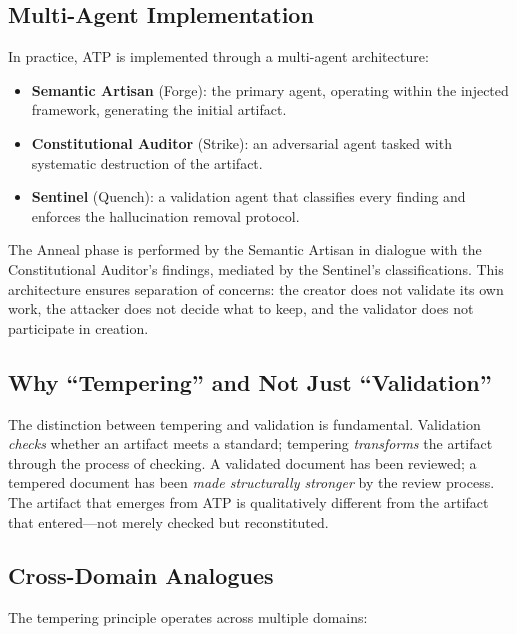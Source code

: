 \documentclass[12pt,a4paper]{article}
\begin{document}
\subsection{Multi-Agent Implementation}

In practice, ATP is implemented through a multi-agent architecture:

\begin{itemize}
  \item \textbf{Semantic Artisan} (Forge): the primary agent, operating within the injected framework, generating the initial artifact.
  \item \textbf{Constitutional Auditor} (Strike): an adversarial agent tasked with systematic destruction of the artifact.
  \item \textbf{Sentinel} (Quench): a validation agent that classifies every finding and enforces the hallucination removal protocol.
\end{itemize}

The Anneal phase is performed by the Semantic Artisan in dialogue with the Constitutional Auditor's findings, mediated by the Sentinel's classifications. This architecture ensures separation of concerns: the creator does not validate its own work, the attacker does not decide what to keep, and the validator does not participate in creation.

\subsection{Why ``Tempering'' and Not Just ``Validation''}

The distinction between tempering and validation is fundamental. Validation \emph{checks} whether an artifact meets a standard; tempering \emph{transforms} the artifact through the process of checking. A validated document has been reviewed; a tempered document has been \emph{made structurally stronger} by the review process. The artifact that emerges from ATP is qualitatively different from the artifact that entered---not merely checked but reconstituted.

\subsection{Cross-Domain Analogues}

The tempering principle operates across multiple domains:
\end{document}
